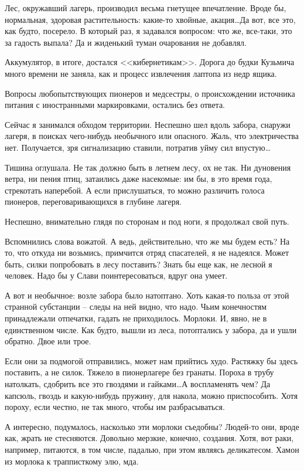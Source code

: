 \documentclass[a4paper]{book}
\begin{document}
Лес, окружавший лагерь, производил весьма гнетущее впечатление. Вроде бы, нормальная, здоровая растительность: какие-то хвойные, акация\ldots Да вот, все это, как будто, посерело. В который раз, я задавался вопросом: что же, все-таки, это за гадость выпала?  Да и жиденький туман очарования не добавлял. 

Аккумулятор, в итоге, достался <<кибернетикам>>. Дорога до будки Кузьмича  много времени не заняла, как и процесс извлечения лаптопа из недр ящика. 

Вопросы любопытствующих пионеров и медсестры, о происхождении источника питания с иностранными маркировками, остались без ответа. 

Сейчас я занимался обходом территории. Неспешно шел вдоль забора, снаружи лагеря, в поисках чего-нибудь необычного или опасного. Жаль, что электричества нет. Получается, зря сигнализацию ставили, потратив уйму сил впустую\ldots

Тишина оглушала. Не так должно быть в летнем лесу, ох не так. Ни дуновения ветра, ни пения птиц, затаились даже насекомые: им бы, в это время года, стрекотать наперебой. А если прислушаться, то можно различить голоса пионеров, переговаривающихся в глубине лагеря.

Неспешно, внимательно глядя по сторонам и под ноги, я продолжал свой путь. 

Вспомнились слова вожатой. А ведь, действительно, что же мы будем есть? На то, что откуда ни возьмись, примчится отряд спасателей, я не надеялся. Может быть, силки попробовать в лесу поставить? Знать бы еще как, не лесной я человек. Надо бы у Слави поинтересоваться, вдруг она умеет.

А вот и необычное: возле забора было натоптано. Хоть какая-то польза от этой странной субстанции -- следы на ней видно, что надо. Чьим конечностям принадлежали отпечатки, гадать не приходилось. Морлоки. И, явно, не в единственном числе. Как будто, вышли из леса, потоптались у забора, да и ушли обратно. Двое или трое. 

Если они за подмогой отправились, может нам прийтись худо. Растяжку бы здесь поставить, а не силок. Тяжело в пионерлагере без гранаты. Пороха в трубу натолкать, сдобрить все это гвоздями и гайками\ldots А воспламенять чем? Да капсюль, гвоздь и какую-нибудь пружину, для накола, можно приспособить. Хотя пороху, если честно, не так много, чтобы им разбрасываться. 

А интересно, подумалось, насколько эти морлоки съедобны? Людей-то они, вроде как, жрать не стесняются. Довольно мерзкие, конечно, создания. Хотя, вот раки, например, питаются, в том числе, падалью, при этом являясь деликатесом. Хамон из морлока к трапписткому элю, мда.
\end{document}
